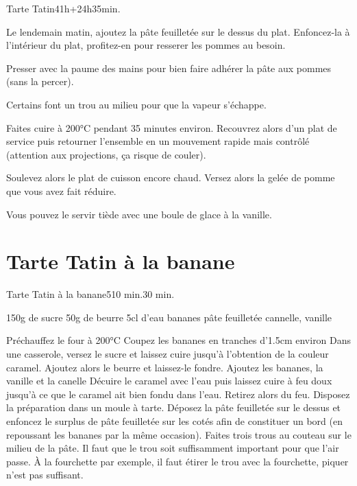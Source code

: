 {\begin{recette}{Tarte Tatin}{4}{1h+24h}{35min.}
\begin{cuisson}
Le lendemain matin, ajoutez la pâte feuilletée sur le dessus du plat. Enfoncez-la à l'intérieur du plat, profitez-en pour 
resserer les pommes au besoin. 

Presser avec la paume des mains pour bien faire adhérer la pâte aux pommes (sans la percer). 

Certains font un trou au milieu pour que la vapeur s'échappe.

Faites cuire à 200°C pendant 35 minutes environ. Recouvrez alors d'un plat de service puis retourner l'ensemble en 
un mouvement rapide mais contrôlé (attention aux projections, ça risque de couler).

Soulevez alors le plat de cuisson encore chaud. Versez alors la gelée de pomme que vous avez fait réduire. 

Vous pouvez le servir tiède avec une boule de glace à la vanille.


\end{cuisson}
\end{recette}

\section{Tarte Tatin à la banane}
\begin{recette}{Tarte Tatin à la banane}{5}{10 min.}{30 min.}
\begin{ingredients}
\ingredient 150g de sucre
\ingredient 50g de beurre
\ingredient 5cl d'eau
 bananes
 pâte feuilletée
\ingredient cannelle, vanille
\end{ingredients}

\begin{preparation}
\etape Préchauffez le four à 200°C
\etape Coupez les bananes en tranches d'1.5cm environ
\etape Dans une casserole, versez le sucre et laissez cuire jusqu'à l'obtention de la couleur caramel. 
\etape Ajoutez alors le beurre et laissez-le fondre. 
\etape Ajoutez les bananes, la vanille et la canelle
\etape Décuire le caramel avec l'eau puis laissez cuire à feu doux jusqu'à ce que le caramel ait bien fondu dans l'eau. Retirez 
alors du feu. 
\etape Disposez la préparation dans un moule à tarte. 
\etape Déposez la pâte feuilletée sur le dessus et enfoncez le surplus de pâte feuilletée sur les cotés afin de constituer un 
bord (en repoussant les bananes par la même occasion).
\etape Faites trois trous au couteau sur le milieu de la pâte. Il faut que le trou soit suffisamment important pour que l'air 
passe. À la fourchette par exemple, il faut étirer le trou avec la fourchette, piquer n'est pas suffisant.
\end{preparation}


\end{recette}}

